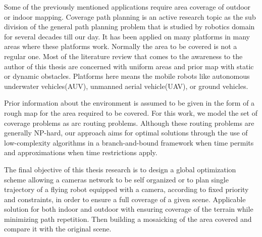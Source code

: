 
Some of the previously mentioned applications require area coverage of outdoor or indoor mapping. Coverage path planning is an active research topic as the sub division of the general path planning problem that is studied by robotics domain for several decades till our day. It has been applied on many platforms in many areas where these platforms work. Normally the area to be covered is not a regular one. Most of the literature review that comes to the awareness to the author of this thesis are concerned with uniform areas and prior map with static or dynamic obstacles. Platforms here means the mobile robots like autonomous underwater vehicles(AUV), unmanned aerial vehicle(UAV), or ground vehicles. 


Prior information about the environment is assumed to be given in the form of a rough map for the area required to be covered. For this work, we model the set of coverage problems as arc routing problems. Although these routing problems are generally NP-hard, our approach aims for optimal solutions through the use of low-complexity algorithms in a branch-and-bound framework when time permits and approximations when time restrictions apply.


The final objective of this thesis research is to design a global optimization scheme allowing a cameras network to be self organized or to plan single trajectory of a flying robot equipped with a camera, according to fixed priority and constraints, in order to ensure a full coverage of a given scene. Applicable solution for both indoor and outdoor with ensuring coverage of the terrain while minimizing path repetition. Then building a mosaicking of the area covered and compare it with the original scene.



